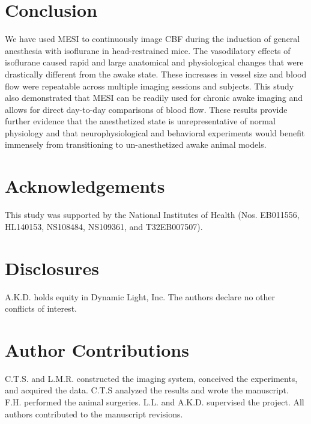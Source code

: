 \documentclass[review]{elsarticle}
\begin{document}
\section{Conclusion}

We have used MESI to continuously image CBF during the induction of general anesthesia with isoflurane in head-restrained mice. The vasodilatory effects of isoflurane caused rapid and large anatomical and physiological changes that were drastically different from the awake state. These increases in vessel size and blood flow were repeatable across multiple imaging sessions and subjects. This study also demonstrated that MESI can be readily used for chronic awake imaging and allows for direct day-to-day comparisons of blood flow. These results provide further evidence that the anesthetized state is unrepresentative of normal physiology and that neurophysiological and behavioral experiments would benefit immensely from transitioning to un-anesthetized awake animal models.



\section*{Acknowledgements}
This study was supported by the National Institutes of Health (Nos. EB011556, HL140153, NS108484, NS109361, and T32EB007507).

\section*{Disclosures}
A.K.D. holds equity in Dynamic Light, Inc. The authors declare no other conflicts of interest.

\section*{Author Contributions}
C.T.S. and L.M.R. constructed the imaging system, conceived the experiments, and acquired the data. C.T.S analyzed the results and wrote the manuscript. F.H. performed the animal surgeries. L.L. and A.K.D. supervised the project. All authors contributed to the manuscript revisions.





\end{document}
